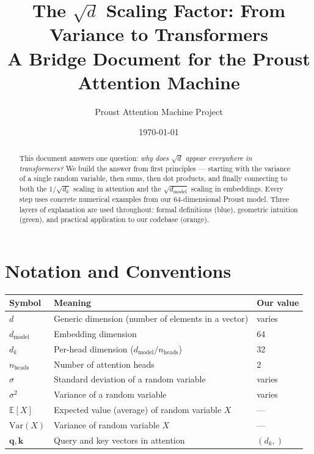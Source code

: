 \documentclass[11pt, a4paper]{article}
\title{\textbf{The $\sqrt{d}$ Scaling Factor: From Variance to Transformers} \\[0.5em]
\large A Bridge Document for the Proust Attention Machine}
\author{Proust Attention Machine Project}
\date{\today}
\begin{document}
\maketitle

\begin{abstract}
This document answers one question: \emph{why does $\sqrt{d}$ appear everywhere in transformers?}
We build the answer from first principles --- starting with the variance of a single random variable,
then sums, then dot products, and finally connecting to both the $1/\sqrt{d_k}$ scaling in attention
and the $\sqrt{d_\text{model}}$ scaling in embeddings. Every step uses concrete numerical examples
from our 64-dimensional Proust model. Three layers of explanation are used throughout:
formal definitions (blue), geometric intuition (green), and practical application to our codebase (orange).
\end{abstract}

\tableofcontents
\newpage


\section{Notation and Conventions}

\begin{tabular}{lll}
\toprule
\textbf{Symbol} & \textbf{Meaning} & \textbf{Our value} \\
\midrule
$d$ & Generic dimension (number of elements in a vector) & varies \\
$d_\text{model}$ & Embedding dimension & 64 \\
$d_k$ & Per-head dimension ($d_\text{model} / n_\text{heads}$) & 32 \\
$n_\text{heads}$ & Number of attention heads & 2 \\
$\sigma$ & Standard deviation of a random variable & varies \\
$\sigma^2$ & Variance of a random variable & varies \\
$\mathbb{E}[X]$ & Expected value (average) of random variable $X$ & --- \\
$\text{Var}(X)$ & Variance of random variable $X$ & --- \\
$\bm{q}, \bm{k}$ & Query and key vectors in attention & $(d_k,)$ \\
\bottomrule
\end{tabular}
\end{document}

